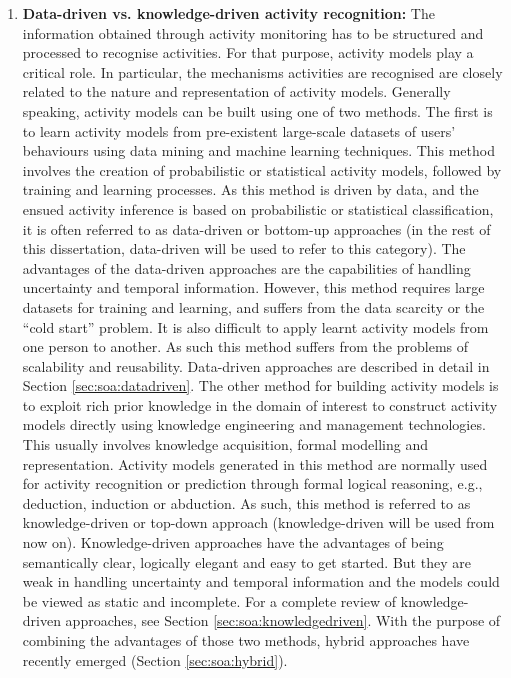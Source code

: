 \begin{enumerate}
 \item \textbf{Data-driven vs. knowledge-driven activity recognition:} The information obtained through activity monitoring has to be structured and processed to recognise activities. For that purpose, activity models play a critical role. In particular, the mechanisms activities are recognised are closely related to the nature and representation of activity models. Generally speaking, activity models can be built using one of two methods. The first is to learn activity models from pre-existent large-scale datasets of users’ behaviours using data mining and machine learning techniques. This method involves the creation of probabilistic or statistical activity models, followed by training and learning processes. As this method is driven by data, and the ensued activity inference is based on probabilistic or statistical classification, it is often referred to as data-driven or bottom-up approaches (in the rest of this dissertation, data-driven will be used to refer to this category). The advantages of the data-driven approaches are the capabilities of handling uncertainty and temporal information. However, this method requires large datasets for training and learning, and suffers from the data scarcity or the “cold start” problem. It is also difficult to apply learnt activity models from one person to another. As such this method suffers from the problems of scalability and reusability. Data-driven approaches are described in detail in Section \ref{sec:soa:datadriven}. The other method for building activity models is to exploit rich prior knowledge in the domain of interest to construct activity models directly using knowledge engineering and management technologies. This usually involves knowledge acquisition, formal modelling and representation. Activity models generated in this method are normally used for activity recognition or prediction through formal logical reasoning, e.g., deduction, induction or abduction. As such, this method is referred to as knowledge-driven or top-down approach (knowledge-driven will be used from now on). Knowledge-driven approaches have the advantages of being semantically clear, logically elegant and easy to get started. But they are weak in handling uncertainty and temporal information and the models could be viewed as static and incomplete. For a complete review of knowledge-driven approaches, see Section \ref{sec:soa:knowledgedriven}. With the purpose of combining the advantages of those two methods, hybrid approaches have recently emerged (Section \ref{sec:soa:hybrid}). 
\end{enumerate}
 
